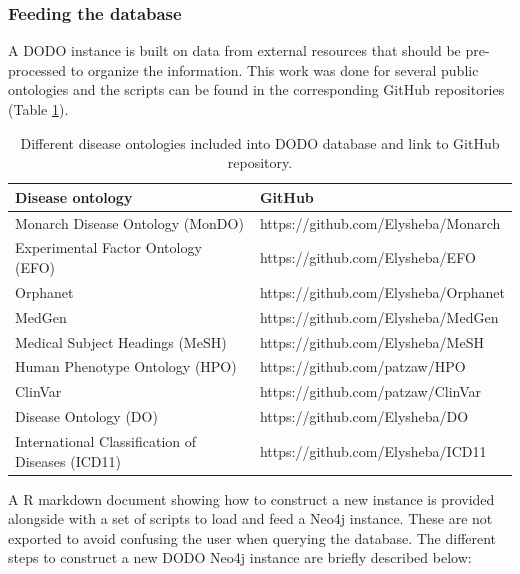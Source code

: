 \documentclass[9pt,a4paper,]{extarticle}
\begin{document}
\hypertarget{feeding-the-database}{%
\subsubsection{Feeding the database}\label{feeding-the-database}}

A DODO instance is built on data from external resources that should be pre-processed to organize the information. This work was done for several public ontologies and the scripts can be found in the corresponding GitHub repositories (Table \ref{tab:githubOntology}).

\begin{table}

\caption{\label{tab:githubOntology}Different disease ontologies included into DODO database and link to GitHub repository.}
\centering
\begin{tabular}[t]{ll}
\toprule
Disease ontology & GitHub\\
\midrule
Monarch Disease Ontology (MonDO) & https://github.com/Elysheba/Monarch\\
Experimental Factor Ontology (EFO) & https://github.com/Elysheba/EFO\\
Orphanet & https://github.com/Elysheba/Orphanet\\
MedGen & https://github.com/Elysheba/MedGen\\
Medical Subject Headings (MeSH) & https://github.com/Elysheba/MeSH\\
\addlinespace
Human Phenotype Ontology (HPO) & https://github.com/patzaw/HPO\\
ClinVar & https://github.com/patzaw/ClinVar\\
Disease Ontology (DO) & https://github.com/Elysheba/DO\\
International Classification of Diseases (ICD11) & https://github.com/Elysheba/ICD11\\
\bottomrule
\end{tabular}
\end{table}

A R markdown document showing how to construct a new instance is provided alongside with a set of scripts to load and feed a Neo4j instance. These are not exported to avoid confusing the user when querying the database. The different steps to construct a new DODO Neo4j instance are briefly described below:
\end{document}

